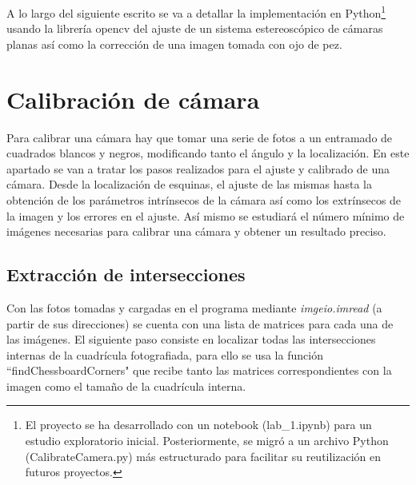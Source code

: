 \documentclass[a4paper,12pt]{article}
\begin{document}
{\vspace{0.5cm}

A lo largo del siguiente escrito se va a detallar la implementación en Python\footnote{El proyecto se ha desarrollado con un notebook (lab\_1.ipynb) para un estudio exploratorio inicial. Posteriormente, se migró a un archivo Python (CalibrateCamera.py) más estructurado para facilitar su reutilización en futuros proyectos.}
 usando la librería opencv del ajuste de un sistema estereoscópico de cámaras planas así como la corrección de una imagen tomada con ojo de pez.
 


\newpage


\section{Calibración de cámara}


\vspace{1.cm}

Para calibrar una cámara hay que tomar una serie de fotos a un entramado de cuadrados blancos y negros, modificando tanto el ángulo y la localización. En este apartado se van a tratar los pasos realizados para el ajuste y calibrado de una cámara. Desde la localización de esquinas, el ajuste de las mismas hasta la obtención de los parámetros intrínsecos de la cámara así como los extrínsecos de la imagen y los errores en el ajuste. Así mismo se estudiará el número mínimo de imágenes necesarias para calibrar una cámara y obtener un resultado preciso.

\vspace{0.5cm}

\subsection{Extracción de intersecciones}

\vspace{0.5cm}

Con las fotos tomadas y cargadas en el programa mediante \textit{imgeio.imread} (a partir de sus direcciones) se cuenta con una lista de matrices para cada una de las imágenes. El siguiente paso consiste en localizar todas las intersecciones internas de la cuadrícula fotografiada, para ello se usa la función ``findChessboardCorners" que recibe tanto las matrices correspondientes con la imagen como el tamaño de la cuadrícula interna.

\vspace{0.5cm}

}
\end{document}
